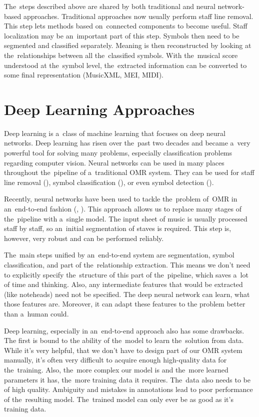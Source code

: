 The~steps described above are shared by both traditional and neural network-based approaches. Traditional approaches now usually perform staff line removal. This step lets methods based on~connected components to become useful. Staff localization may be an~important part of this step. Symbols then need to be segmented and classified separately. Meaning is then reconstructed by looking at the~relationships between all the~classified symbols. With the~musical score understood at the~symbol level, the~extracted information can be converted to some final representation (MusicXML, MEI, MIDI).


\section{Deep Learning Approaches}

Deep learning is a~class of machine learning that focuses on deep neural networks. Deep learning has risen over the~past two decades and became a~very powerful tool for solving many problems, especially classification problems regarding computer vision. Neural networks can be used in many places throughout the~pipeline of a~traditional OMR system. They can be used for staff line removal (\cite{CalvoZaragoza2017}), symbol classification (\cite{Lee2016}), or even symbol detection (\cite{Pacha2018}).

Recently, neural networks have been used to tackle the~problem of~OMR in an~end-to-end fashion (\cite{Primus}, \cite{HmrBaseline}). This approach allows us to replace many stages of the~pipeline with a~single model. The input sheet of music is usually processed staff by staff, so an~initial segmentation of staves is required. This step is, however, very robust and can be performed reliably.

The~main steps unified by an~end-to-end system are segmentation, symbol classification, and part of the~relationship extraction. This means we don't need to explicitly specify the~structure of this part of the~pipeline, which saves a~lot of time and thinking. Also, any intermediate features that would be extracted (like noteheads) need not be specified. The deep neural network can learn, what those features are. Moreover, it can adapt these features to the problem better than a~human could.

Deep learning, especially in an~end-to-end approach also has some drawbacks. The first is bound to the ability of the~model to learn the~solution from data. While it's very helpful, that we don't have to design part of our OMR system manually, it's often very difficult to acquire enough high-quality data for the~training. Also, the~more complex our model is and the~more learned parameters it has, the~more training data it requires. The~data also needs to be of high quality. Ambiguity and mistakes in annotations lead to poor performance of the~resulting model. The~trained model can only ever be as good as it's training data.

